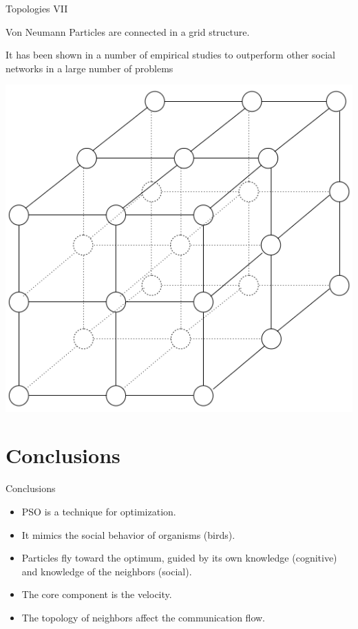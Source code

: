 \documentclass[aspectratio=169,compress,10pt]{beamer}
\begin{document}
\begin{frame}{Topologies VII}
\begin{block}{Von Neumann}
Particles are connected in a grid structure. 

It has been shown in a number of empirical studies to outperform other social networks in a large number of problems

\centering
\includegraphics[scale=0.25]{../resources/von-neumann}
\end{block}
\end{frame}

\section{Conclusions}
\begin{frame}{Conclusions}
    \begin{itemize}
    	\item PSO is a technique for optimization.
    	\item It mimics the social behavior of organisms (birds).
    	\item Particles fly toward the optimum, guided by its own knowledge (cognitive) and knowledge of the neighbors (social).
    	\item The core component is the velocity.
    	\item The topology of neighbors affect the communication flow.
    \end{itemize}


\end{frame}
\end{document}
